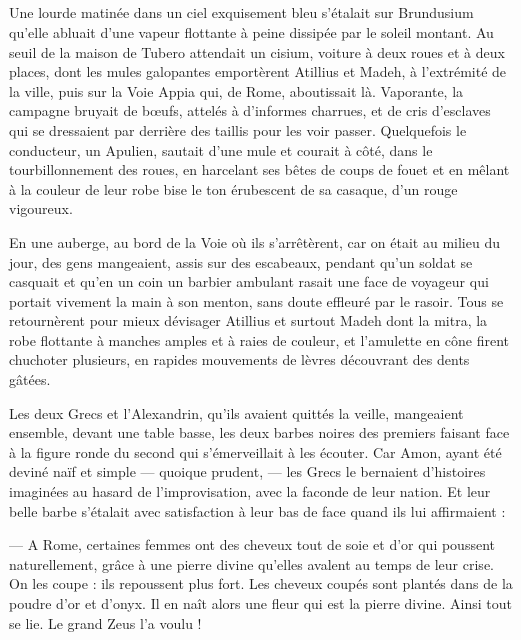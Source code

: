 \documentclass[a4paper, 11pt, oneside, polutonikogreek, french]{article}
\begin{document}
\subsection{}
\paragraph{}
Une lourde matinée dans un ciel exquisement bleu s'étalait sur Brundusium qu'elle abluait d'une vapeur flottante à peine dissipée par le soleil montant. Au seuil de la maison de Tubero attendait un cisium, voiture à deux roues et à deux places, dont les mules galopantes emportèrent Atillius et Madeh, à l'extrémité de la ville, puis sur la Voie Appia qui, de Rome, aboutissait là. Vaporante, la campagne bruyait de bœufs, attelés à d'informes charrues, et de cris d'esclaves qui se dressaient par derrière des taillis pour les voir passer. Quelquefois le conducteur, un Apulien, sautait d'une mule et courait à côté, dans le tourbillonnement des roues, en harcelant ses bêtes de coups de fouet et en mêlant à la couleur de leur robe bise le ton érubescent de sa casaque, d'un rouge vigoureux.

En une auberge, au bord de la Voie où ils s'arrêtèrent, car on était au milieu du jour, des gens mangeaient, assis sur des escabeaux, pendant qu'un soldat se casquait et qu'en un coin un barbier ambulant rasait une face de voyageur qui portait vivement la main à son menton, sans doute effleuré par le rasoir. Tous se retournèrent pour mieux dévisager Atillius et surtout Madeh dont la mitra, la robe flottante à manches amples et à raies de couleur, et l'amulette en cône firent chuchoter plusieurs, en rapides mouvements de lèvres découvrant des dents gâtées.

Les deux Grecs et l'Alexandrin, qu'ils avaient quittés la veille, mangeaient ensemble, devant une table basse, les deux barbes noires des premiers faisant face à la figure ronde du second qui s'émerveillait à les écouter. Car Amon, ayant été deviné naïf et simple --- quoique prudent, --- les Grecs le bernaient d'histoires imaginées au hasard de l'improvisation, avec la faconde de leur nation. Et leur belle barbe s'étalait avec satisfaction à leur bas de face quand ils lui affirmaient :

--- A Rome, certaines femmes ont des cheveux tout de soie et d'or qui poussent naturellement, grâce à une pierre divine qu'elles avalent au temps de leur crise. On les coupe : ils repoussent plus fort. Les cheveux coupés sont plantés dans de la poudre d'or et d'onyx. Il en naît alors une fleur qui est la pierre divine. Ainsi tout se lie. Le grand Zeus l'a voulu !
\end{document}

